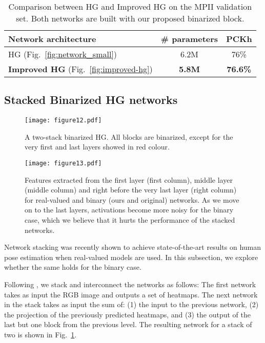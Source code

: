\documentclass[10pt,journal,compsoc]{IEEEtran}
\begin{document}
\begin{table}[!htbp]
    \renewcommand{\arraystretch}{1.3}
    \caption{Comparison between HG and Improved HG on the MPII validation set. Both networks are built with our proposed binarized block.}
    \label{tab:improved_hg}
    \centering
    \begin{tabular}{|l|c|c|}
        \hline
        Network architecture                    & \# parameters & PCKh            \\
        \hline\hline
        HG (Fig.~\ref{fig:network_small})                & 6.2M          & 76\%            \\
        \hline
        \textbf{Improved HG} (Fig.~\ref{fig:improved-hg}) & \textbf{5.8M} & \textbf{76.6\%} \\
        \hline
    \end{tabular}
\end{table}

\subsection{Stacked Binarized HG networks}\label{ssec:stack-hg}

\begin{figure}[!htb]
    \centering
    \texttt{[image: figure12.pdf]}
    \caption{A two-stack binarized HG. All blocks are binarized, except for the very first and last layers showed in red colour.}
    \label{fig:stacked-hg}
\end{figure}

\begin{figure}[!htb]
    \centering
    \texttt{[image: figure13.pdf]}
    \caption{Features extracted from the first layer (first column), middle layer (middle column) and right before the very last layer (right column) for real-valued and binary (ours and original) networks. As we move on to the last layers, activations become more noisy for the binary case, which we believe that it hurts the performance of the stacked networks.}
    \label{fig:activation_maps}
\end{figure}

Network stacking was recently shown to achieve state-of-the-art results on human pose estimation\cite{bulat2016human,newell2016stacked,wei2016convolutional} when real-valued models are used. In this subsection, we explore whether the same holds for the binary case.

Following \cite{newell2016stacked}, we stack and interconnect the networks as follows: The first network takes as input the RGB image and outputs a set of  heatmaps. The next network in the stack takes as input the sum of: (1) the input to the previous network, (2) the projection of the previously  predicted heatmaps, and (3) the output of the last but one block from the previous level. The resulting network for a stack of two is shown in Fig.~\ref{fig:stacked-hg}. 
\end{document}
